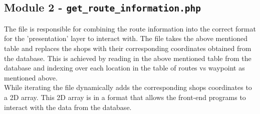\documentclass[10pt, a4paper, onecolumn]{scrartcl}
\begin{document}
			\subsection{Module 2 - \texttt{get\_route\_information.php}}
			
				The file is responsible for combining the route information into the correct format for the 'presentation' layer to interact with. The file takes the above mentioned table and replaces the shops with their corresponding coordinates obtained from the database. This is achieved by reading in the above mentioned table from the database and indexing over each location in the table of routes vs waypoint as mentioned above. \\
				
				While iterating the file dynamically adds the corresponding shops coordinates to a 2D array. This 2D array is in a format that allows the front-end programs to interact with the data from the database. 
	
\end{document}
